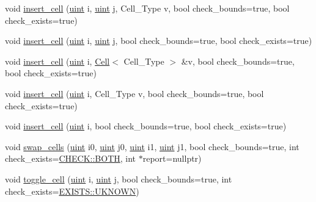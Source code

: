 \begin{Indent}
\begin{DoxyCompactItemize}
\item 
void \hyperlink{class_b_array_aa7268761d977833b688123d161d17d1b}{insert\+\_\+cell} (\hyperlink{typedefs_8hpp_a91ad9478d81a7aaf2593e8d9c3d06a14}{uint} i, \hyperlink{typedefs_8hpp_a91ad9478d81a7aaf2593e8d9c3d06a14}{uint} j, Cell\+\_\+\+Type v, bool check\+\_\+bounds=true, bool check\+\_\+exists=true)
\item 
void \hyperlink{class_b_array_a4deb6afa6040603fc4fb5a90eef90761}{insert\+\_\+cell} (\hyperlink{typedefs_8hpp_a91ad9478d81a7aaf2593e8d9c3d06a14}{uint} i, \hyperlink{typedefs_8hpp_a91ad9478d81a7aaf2593e8d9c3d06a14}{uint} j, bool check\+\_\+bounds=true, bool check\+\_\+exists=true)
\item 
void \hyperlink{class_b_array_ac631a7a4b7308b00073a5e521d548933}{insert\+\_\+cell} (\hyperlink{typedefs_8hpp_a91ad9478d81a7aaf2593e8d9c3d06a14}{uint} i, \hyperlink{class_cell}{Cell}$<$ Cell\+\_\+\+Type $>$ \&v, bool check\+\_\+bounds=true, bool check\+\_\+exists=true)
\item 
void \hyperlink{class_b_array_aeeee5972aa4301465b84dfc431fa6cf9}{insert\+\_\+cell} (\hyperlink{typedefs_8hpp_a91ad9478d81a7aaf2593e8d9c3d06a14}{uint} i, Cell\+\_\+\+Type v, bool check\+\_\+bounds=true, bool check\+\_\+exists=true)
\item 
void \hyperlink{class_b_array_a8e930e9e59632684e9526f499bfff0e1}{insert\+\_\+cell} (\hyperlink{typedefs_8hpp_a91ad9478d81a7aaf2593e8d9c3d06a14}{uint} i, bool check\+\_\+bounds=true, bool check\+\_\+exists=true)
\item 
void \hyperlink{class_b_array_afb7976f67770b850922c1a7e1d6b07cc}{swap\+\_\+cells} (\hyperlink{typedefs_8hpp_a91ad9478d81a7aaf2593e8d9c3d06a14}{uint} i0, \hyperlink{typedefs_8hpp_a91ad9478d81a7aaf2593e8d9c3d06a14}{uint} j0, \hyperlink{typedefs_8hpp_a91ad9478d81a7aaf2593e8d9c3d06a14}{uint} i1, \hyperlink{typedefs_8hpp_a91ad9478d81a7aaf2593e8d9c3d06a14}{uint} j1, bool check\+\_\+bounds=true, int check\+\_\+exists=\hyperlink{namespace_c_h_e_c_k_a3acda1c74bfabb5b6b67e19d0ad2d52a}{C\+H\+E\+C\+K\+::\+B\+O\+TH}, int $\ast$report=nullptr)
\item 
void \hyperlink{class_b_array_a2ab2b200b329abc718cfb3574f566cf6}{toggle\+\_\+cell} (\hyperlink{typedefs_8hpp_a91ad9478d81a7aaf2593e8d9c3d06a14}{uint} i, \hyperlink{typedefs_8hpp_a91ad9478d81a7aaf2593e8d9c3d06a14}{uint} j, bool check\+\_\+bounds=true, int check\+\_\+exists=\hyperlink{namespace_e_x_i_s_t_s_a81eb362d951445c658942a433afddb97}{E\+X\+I\+S\+T\+S\+::\+U\+K\+N\+O\+WN})
\end{DoxyCompactItemize}
\end{Indent}
